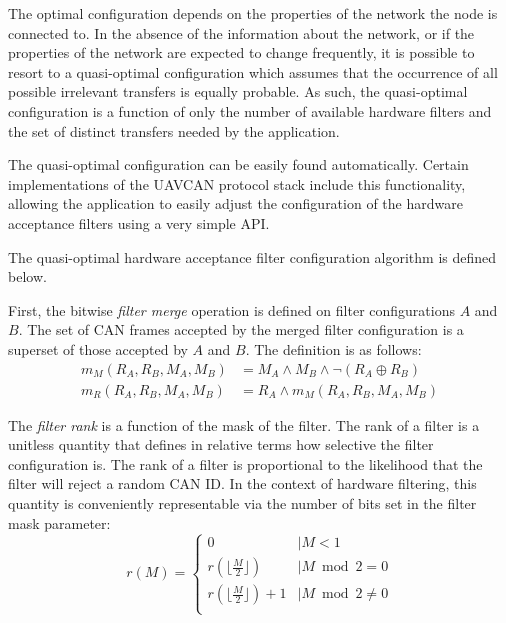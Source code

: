 \begin{remark}[breakable]
    The optimal configuration depends on the properties of the network the node is connected to.
    In the absence of the information about the network,
    or if the properties of the network are expected to change frequently,
    it is possible to resort to a quasi-optimal configuration which assumes that
    the occurrence of all possible irrelevant transfers is equally probable.
    As such, the quasi-optimal configuration is a function of only the number of available hardware filters
    and the set of distinct transfers needed by the application.

    The quasi-optimal configuration can be easily found automatically.
    Certain implementations of the UAVCAN protocol stack include this functionality,
    allowing the application to easily adjust the configuration of the hardware acceptance filters
    using a very simple API.

    The quasi-optimal hardware acceptance filter configuration algorithm is defined below.

    First, the bitwise \emph{filter merge} operation is defined on filter configurations $A$ and $B$.
    The set of CAN frames accepted by the merged filter configuration is a superset of
    those accepted by $A$ and $B$.
    The definition is as follows:
    \begin{equation*}
    \begin{split}
        m_M(R_A, R_B, M_A, M_B) & = M_A \land M_B \land \neg (R_A \oplus R_B) \\
        m_R(R_A, R_B, M_A, M_B) & = R_A \land m_M(R_A, R_B, M_A, M_B)
    \end{split}
    \end{equation*}

    The \emph{filter rank} is a function of the mask of the filter.
    The rank of a filter is a unitless quantity that defines in relative terms how selective the filter
    configuration is.
    The rank of a filter is proportional to the likelihood that the filter will reject a random CAN ID.
    In the context of hardware filtering, this quantity is conveniently representable via the number of bits set in
    the filter mask parameter:
    \begin{equation*}
    r(M) =
    \begin{cases}
        0                                   &\mid M < 1 \\
        r(\lfloor\frac{M}{2}\rfloor)        &\mid M \bmod 2 = 0 \\
        r(\lfloor\frac{M}{2}\rfloor) + 1    &\mid M \bmod 2 \neq 0 \\
    \end{cases}
    \end{equation*}


\end{remark}
